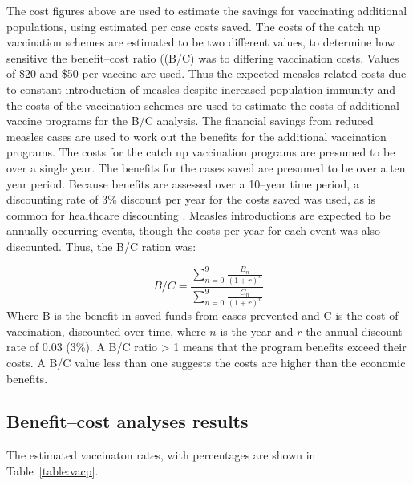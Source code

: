 \documentclass{article}
\begin{document}
The cost figures above are used to estimate the savings for vaccinating additional populations, using estimated per case costs saved. The costs of the catch up vaccination schemes are estimated to be two different values, to determine how sensitive the benefit--cost ratio ((B/C) was to differing vaccination costs. Values of \$20 and \$50 per vaccine are used. Thus the expected measles-related costs due to constant introduction of measles despite increased population immunity and the costs of the vaccination schemes are used to estimate the costs of additional vaccine programs for the B/C analysis. The financial savings from reduced measles cases are used to work out the benefits for the additional vaccination programs. The costs for the catch up vaccination programs are presumed to be over a single year. The benefits for the cases saved are presumed to be over a ten year period. Because benefits are assessed over a 10--year time period, a discounting rate of 3\% discount per year for the costs saved was used, as is common for healthcare discounting \citep{honeycutt6}. Measles introductions are expected to be annually occurring events, though the costs per year for each event was also discounted. Thus, the B/C ration was:

\begin{equation} \label{eq:bc}
 \textit{B/C} = \frac{\sum\limits_{n=0}^{9} \frac{B_n}{(1+r)^n}}{\sum\limits_{n=0}^{9} \frac{C_n}{(1+r)^n}}
 \end{equation}
Where B is the benefit in saved funds from cases prevented and C is the cost of vaccination, discounted over time, where $n$ is the year and $r$ the annual discount rate of 0.03 (3\%).
A B/C ratio > 1 means that the program benefits exceed their costs. A B/C value less than one suggests the costs are higher than the economic benefits.

\subsection{Benefit--cost analyses results}

The estimated vaccinaton rates, with percentages are shown in Table~\autoref{table:vacp}.
\end{document}
